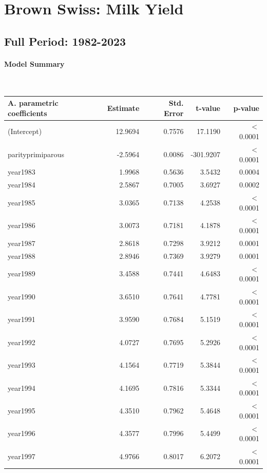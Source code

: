 \section{Brown Swiss: Milk Yield}
\subsection{Full Period: 1982-2023}\label{model:bs_milk_full}
\paragraph{Model Summary} \quad \\

    \begin{table}[H]
    \centering
    \begin{tabular}{lrrrr}
    \textbf{A. parametric coefficients} & Estimate & Std. Error & t-value & p-value \\ 
       \hline
       \hline
      (Intercept) & 12.9694 & 0.7576 & 17.1190 & $<$ 0.0001 \\ 
      parityprimiparous & -2.5964 & 0.0086 & -301.9207 & $<$ 0.0001 \\ 
      year1983 & 1.9968 & 0.5636 & 3.5432 & 0.0004 \\ 
      year1984 & 2.5867 & 0.7005 & 3.6927 & 0.0002 \\ 
      year1985 & 3.0365 & 0.7138 & 4.2538 & $<$ 0.0001 \\ 
      year1986 & 3.0073 & 0.7181 & 4.1878 & $<$ 0.0001 \\ 
      year1987 & 2.8618 & 0.7298 & 3.9212 & 0.0001 \\ 
      year1988 & 2.8946 & 0.7369 & 3.9279 & 0.0001 \\ 
      year1989 & 3.4588 & 0.7441 & 4.6483 & $<$ 0.0001 \\ 
      year1990 & 3.6510 & 0.7641 & 4.7781 & $<$ 0.0001 \\ 
      year1991 & 3.9590 & 0.7684 & 5.1519 & $<$ 0.0001 \\ 
      year1992 & 4.0727 & 0.7695 & 5.2926 & $<$ 0.0001 \\ 
      year1993 & 4.1564 & 0.7719 & 5.3844 & $<$ 0.0001 \\ 
      year1994 & 4.1695 & 0.7816 & 5.3344 & $<$ 0.0001 \\ 
      year1995 & 4.3510 & 0.7962 & 5.4648 & $<$ 0.0001 \\ 
      year1996 & 4.3577 & 0.7996 & 5.4499 & $<$ 0.0001 \\ 
      year1997 & 4.9766 & 0.8017 & 6.2072 & $<$ 0.0001 \\ 

\end{tabular}
\end{table}
